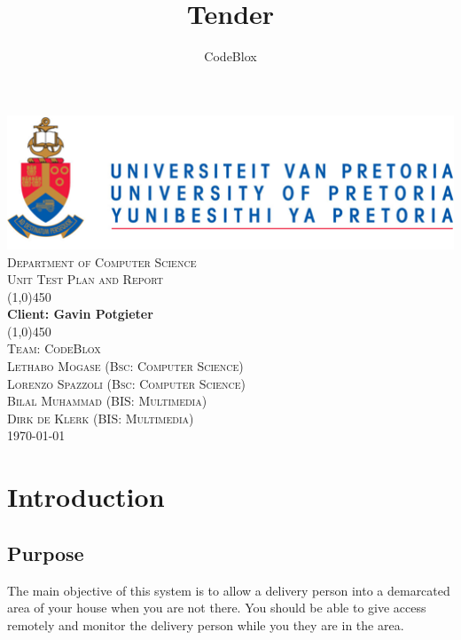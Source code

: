 \documentclass[a4paper,12pt]{article}
\author{CodeBlox}
\title{Tender}
\begin{document}
	\setlength{\parskip}{6pt}
	
	\begin{titlepage}
		\begin{center}
			\includegraphics[width=1\textwidth]{./Pictures/up_logo.png}\\[1.5cm] 
			\textsc{\LARGE Department of Computer Science} \\ [.5cm]
			\textsc{\Large Unit Test Plan and Report} \\ [.5cm]
			\line(1,0){450}\\[.5cm]
			\huge{\bfseries Client: Gavin Potgieter}\\
			\line(1,0){450}\\[.5cm]
			\textsc{\LARGE Team: CodeBlox}\\ [0.5cm]
			
			
			\textsc{\large Lethabo Mogase (Bsc: Computer Science)}\\
			\textsc{\large Lorenzo Spazzoli (Bsc: Computer Science)}\\
			\textsc{\large Bilal Muhammad (BIS: Multimedia)}\\
			\textsc{\large Dirk de Klerk (BIS: Multimedia)}\\ [3.9cm]
			
			\large\today
		\end{center}
	\end{titlepage}
	
	\tableofcontents
	\thispagestyle{empty}
	\footnotesize
	\normalsize
	
	
	
	
	\newpage
	\section{Introduction}
		\subsection{Purpose}
		The main objective of this system is to allow a delivery person into a demarcated area of your house when you are not there. You should be able to give access remotely and monitor the delivery person while you they are in the area.
		
\end{document}
